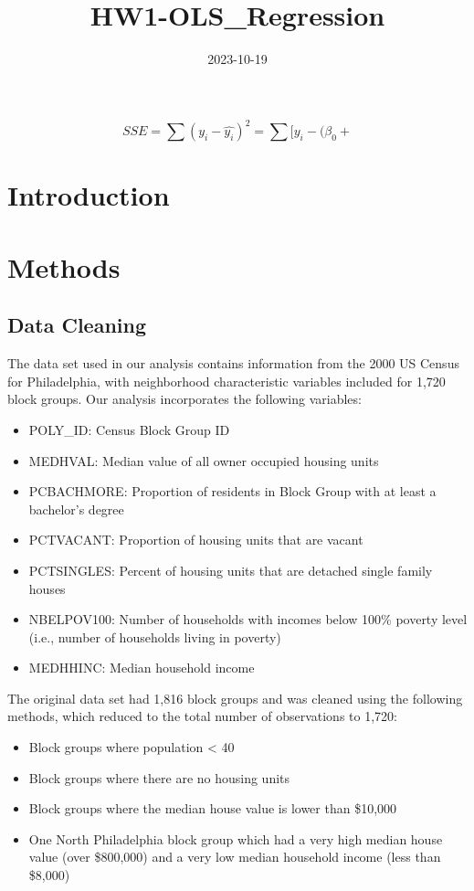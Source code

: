\documentclass[
]{article}
\title{HW1-OLS\_Regression}
\author{}
\date{\vspace{-2.5em}2023-10-19}
\providecommand{\tightlist}{%
  \setlength{\itemsep}{0pt}\setlength{\parskip}{0pt}}
\begin{document}
\maketitle

\[SSE = \sum(y_i - \hat{y_i})^2 = \sum[y_i - (\beta_0 + \]

\hypertarget{introduction}{%
\section{Introduction}\label{introduction}}

\hypertarget{methods}{%
\section{Methods}\label{methods}}

\hypertarget{data-cleaning}{%
\subsection{Data Cleaning}\label{data-cleaning}}

The data set used in our analysis contains information from the 2000 US
Census for Philadelphia, with neighborhood characteristic variables
included for 1,720 block groups. Our analysis incorporates the following
variables:

\begin{itemize}
\tightlist
\item
  POLY\_ID: Census Block Group ID
\item
  MEDHVAL: Median value of all owner occupied housing units
\item
  PCBACHMORE: Proportion of residents in Block Group with at least a
  bachelor's degree
\item
  PCTVACANT: Proportion of housing units that are vacant
\item
  PCTSINGLES: Percent of housing units that are detached single family
  houses
\item
  NBELPOV100: Number of households with incomes below 100\% poverty
  level (i.e., number of households living in poverty)
\item
  MEDHHINC: Median household income
\end{itemize}

The original data set had 1,816 block groups and was cleaned using the
following methods, which reduced to the total number of observations to
1,720:

\begin{itemize}
\tightlist
\item
  Block groups where population \textless{} 40
\item
  Block groups where there are no housing units
\item
  Block groups where the median house value is lower than \$10,000
\item
  One North Philadelphia block group which had a very high median house
  value (over \$800,000) and a very low median household income (less
  than \$8,000)
\end{itemize}
\end{document}
